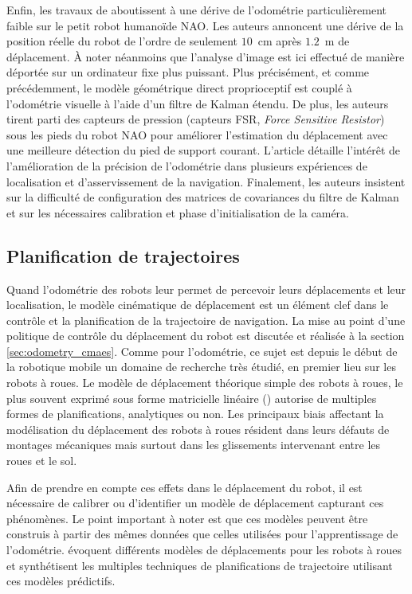 Enfin, les travaux de \cite{oriolo_humanoid_2016} aboutissent à une dérive
de l'odométrie particulièrement faible sur le petit robot humanoïde NAO.
Les auteurs annoncent une dérive de la position réelle du robot
de l'ordre de seulement $10$~cm après $1.2$~m de déplacement.
À noter néanmoins que l'analyse d'image est ici effectué de manière 
déportée sur un ordinateur fixe plus puissant.
Plus précisément, et comme précédemment, le modèle géométrique direct
proprioceptif est couplé à l'odométrie visuelle à l'aide d'un filtre
de Kalman étendu. 
De plus, les auteurs tirent parti des capteurs de pression
(capteurs FSR, \textit{Force Sensitive Resistor})
sous les pieds du robot NAO pour améliorer l'estimation du déplacement 
avec une meilleure détection du pied de support courant.
L'article détaille l'intérêt de l'amélioration de la précision de l'odométrie 
dans plusieurs expériences de localisation et d'asservissement de la navigation.
Finalement, les auteurs insistent sur la difficulté de configuration
des matrices de covariances du filtre de Kalman et sur les nécessaires 
calibration et phase d'initialisation de la caméra.

\subsection{Planification de trajectoires}

Quand l'odométrie des robots leur permet de percevoir leurs
déplacements et leur localisation, le modèle cinématique de 
déplacement est un élément clef dans le contrôle et la planification
de la trajectoire de navigation.
La mise au point d'une politique de contrôle du déplacement du robot
est discutée et réalisée à la section \ref{sec:odometry_cmaes}.
Comme pour l'odométrie, ce sujet est depuis le début
de la robotique mobile un domaine de recherche très étudié, 
en premier lieu sur les robots à roues.
Le modèle de déplacement théorique simple des robots à roues,
le plus souvent exprimé sous forme matricielle linéaire
(\cite{muir_kinematic_1987}) autorise de multiples formes
de planifications, analytiques ou non.
Les principaux biais affectant la modélisation du déplacement
des robots à roues résident dans leurs défauts de montages mécaniques 
mais surtout dans les glissements intervenant entre les roues et 
le sol.

Afin de prendre en compte ces effets dans le déplacement du robot,
il est nécessaire de calibrer ou d'identifier un modèle de déplacement 
capturant ces phénomènes.
Le point important à noter est que ces modèles peuvent être
construis à partir des mêmes données que celles utilisées pour
l'apprentissage de l'odométrie.
\cite{howard_model-predictive_2014} évoquent différents modèles
de déplacements pour les robots à roues et synthétisent les multiples
techniques de planifications de trajectoire utilisant ces modèles
prédictifs.

